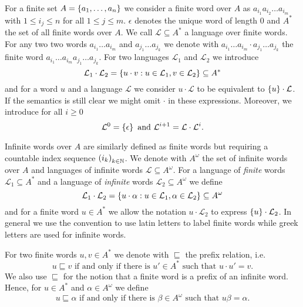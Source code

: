For a finite set $A = \left\{a_{1},\dots, a_{n}\right\}$ we consider a finite word over
$A$ as $a_{i_{1}}a_{i_{2}}\dots a_{i_{m}}$ with $1\leq i_{j}\leq n$ for all 
$1\leq j\leq m$. $\epsilon$ denotes the unique word of length $0$ and $A^{*}$
the set of all finite words over $A$.
We call $\mathcal{L}\subseteq A^{*}$ a language 
over finite words. For any two two words $a_{i_{1}}\dots a_{i_{m}}$ and
$a_{j_{1}}\dots a_{j_{k}}$ we denote with 
$a_{i_{1}}\dots a_{i_{m}}\cdot a_{j_{1}}\dots a_{j_{k}}$ the finite word
$a_{i_{1}}\dots a_{i_{m}}a_{j_{1}}\dots a_{j_{k}}$. For two languages 
$\mathcal{L}_{1}$ and $\mathcal{L}_{2}$ we introduce
\begin{equation*}
  \mathcal{L}_{1}\cdot\mathcal{L}_{2} = \left\{
    u\cdot v: u\in\mathcal{L}_{1}, v\in\mathcal{L}_{2}\right\}\subseteq A^{*}
\end{equation*}
and for a word $u$ and a language $\mathcal{L}$ we consider 
$u\cdot\mathcal{L}$ to be equivalent to $\left\{u\right\}\cdot\mathcal{L}$. If the 
semantics is still clear we might omit $\cdot$ in these expressions. Moreover,
we introduce for all $i\geq 0$
\begin{equation*}
  \mathcal{L}^{0} = \left\{\epsilon\right\}
  \text{ and }\mathcal{L}^{i+1} = \mathcal{L}\cdot \mathcal{L}^{i}.
\end{equation*}

Infinite words over $A$ are similarly defined as finite words but requiring a
countable index sequence $\left(i_{k}\right)_{k\in\mathbb{N}}$. We denote with 
$A^{\omega}$ the set of infinite words over $A$ and languages of infinite 
words $\mathcal{L}\subseteq A^{\omega}$. For a language of \emph{finite} words
$\mathcal{L}_{1}\subseteq A^{*}$
and a language of \emph{infinite} words $\mathcal{L}_{2}\subseteq A^{\omega}$
we define
\begin{equation*}
  \mathcal{L}_{1}\cdot\mathcal{L}_{2} = \left\{
    u\cdot\alpha:u\in\mathcal{L}_{1}, \alpha\in\mathcal{L}_{2}\right\}
  \subseteq A^{\omega}
\end{equation*}
and for a finite word $u\in A^{*}$ we allow the notation
$u\cdot\mathcal{L}_{2}$ to express $\left\{u\right\}\cdot\mathcal{L}_{2}$. In general we
use the convention to use latin letters to label finite words while greek 
letters are used for infinite words.

For two finite words $u, v\in A^{*}$ we denote with $\sqsubseteq$ the prefix 
relation, i.e.
\begin{equation*}
  u\sqsubseteq v \text{ if and only if there is }u'\in A^{*}\text{ such that }
    u\cdot u' = v.
\end{equation*}
We also use $\sqsubseteq$ for the notion that a finite word is a prefix of an
infinite word. Hence, for $u\in A^{*}$ and $\alpha\in A^{\omega}$ we define
\begin{equation*}
  u\sqsubseteq\alpha\text{ if and only if there is }\beta\in A^{\omega}
    \text{ such that }u\beta = \alpha.
\end{equation*}

